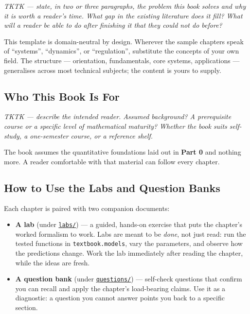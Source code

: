 \documentclass[
]{article}
\providecommand{\tightlist}{%
  \setlength{\itemsep}{0pt}\setlength{\parskip}{0pt}}
\theoremstyle{plain}
\theoremstyle{definition}
\begin{document}
\emph{TKTK --- state, in two or three paragraphs, the problem this book
solves and why it is worth a reader's time. What gap in the existing
literature does it fill? What will a reader be able to do after
finishing it that they could not do before?}

This template is domain-neutral by design. Wherever the sample chapters
speak of ``systems'', ``dynamics'', or ``regulation'', substitute the
concepts of your own field. The structure --- orientation, fundamentals,
core systems, applications --- generalises across most technical
subjects; the content is yours to supply.

\subsection{Who This Book Is For}\label{who-this-book-is-for}

\emph{TKTK --- describe the intended reader. Assumed background? A
prerequisite course or a specific level of mathematical maturity?
Whether the book suits self-study, a one-semester course, or a reference
shelf.}

The book assumes the quantitative foundations laid out in \textbf{Part
0} and nothing more. A reader comfortable with that material can follow
every chapter.

\subsection{How to Use the Labs and Question
Banks}\label{how-to-use-the-labs-and-question-banks}

Each chapter is paired with two companion documents:

\begin{itemize}
\tightlist
\item
  \textbf{A lab} (under \href{labs/}{\texttt{labs/}}) --- a guided,
  hands-on exercise that puts the chapter's worked formalism to work.
  Labs are meant to be \emph{done}, not just read: run the tested
  functions in \texttt{textbook.models}, vary the parameters, and
  observe how the predictions change. Work the lab immediately after
  reading the chapter, while the ideas are fresh.
\item
  \textbf{A question bank} (under
  \href{questions/}{\texttt{questions/}}) --- self-check questions that
  confirm you can recall and apply the chapter's load-bearing claims.
  Use it as a diagnostic: a question you cannot answer points you back
  to a specific section.
\end{itemize}
\end{document}
